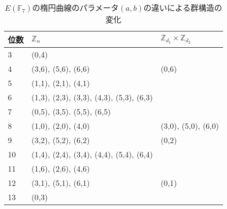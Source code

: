 \begin{table}[htb]\label{table:EFF_7}
\begin{center}
\caption{$E(\mathbb{F}_7)$の楕円曲線のパラメータ$(a,b)$の違いによる群構造の変化}
\begin{tabular}{|l|l|l|}\hline
位数 & $\mathbb{Z}_n$                         & $\mathbb{Z}_{d_1}\times\mathbb{Z}_{d_2}$ \\\hline\hline
3  & (0,4)                                    &                                          \\\hline
4  & (3,6), (5,6), (6,6)                      & (0,6)                                    \\\hline
5  & (1,1), (2,1), (4,1)                      &                                          \\\hline
6  & (1,3), (2,3), (3,3), (4,3), (5,3), (6,3) &                                          \\\hline
7  & (0,5), (3,5). (5,5), (6,5)               &                                          \\\hline
8  & (1,0), (2,0), (4,0)                      & (3,0), (5,0), (6,0)                      \\\hline
9  & (3,2), (5,2), (6,2)                      & (0,2)                                    \\\hline
10 & (1,4), (2,4), (3,4), (4,4), (5,4), (6,4) &                                          \\\hline
11 & (1,6), (2,6), (4,6)                      &                                          \\\hline
12 & (3,1), (5,1), (6,1)                      & (0,1)                                    \\\hline
13 & (0,3)                                    &                                          \\\hline
\end{tabular}
\end{center}
\end{table}

